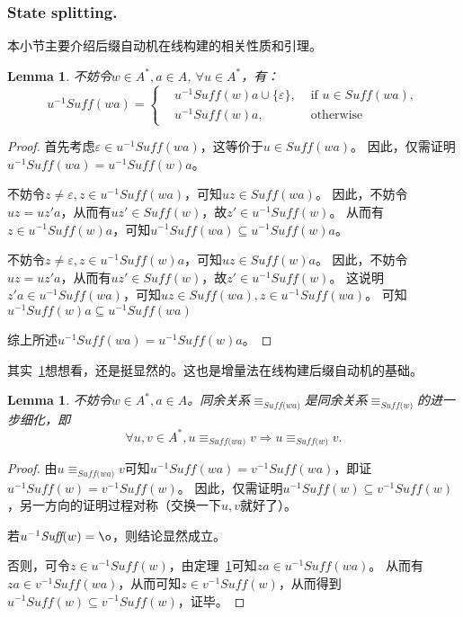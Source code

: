 \documentclass[UTF8]{ctexart}
\newtheorem{lem}[thm]{Lemma}
\theoremstyle{definition}
\theoremstyle{remark}
\numberwithin{equation}{subsection}
\newcommand{\equsuf}[1][x]{\equiv_{\textit{Suff(#1)}}}
\newcommand{\Suff}{\textit{Suff}}
\begin{document}
\subsubsection{State splitting.}
	本小节主要介绍后缀自动机在线构建的相关性质和引理。
	
	\begin{lem}
	\label{lem:sam_build_suff}
		不妨令$w \in A^*, a \in A$, $\forall u \in A^*$，有：
		\[
			u^{-1} \Suff(wa) =
			\left\{
				\begin{aligned}
					&u^{-1} \Suff(w)a \cup \{ \varepsilon \},	&\text{ if } u \in \Suff(wa),	\\
					&u^{-1} \Suff(w)a,							&\text{ otherwise }
				\end{aligned}
			\right .
		\]
	\end{lem}
	\begin{proof}
		首先考虑$\varepsilon \in u^{-1} \Suff(wa)$，这等价于$u \in \Suff(wa)$。
		因此，仅需证明$u^{-1} \Suff(wa) = u^{-1} \Suff(w)a$。
		
		不妨令$z \neq \varepsilon, z \in u^{-1} \Suff(wa)$，可知$uz \in \Suff(wa)$。
		因此，不妨令$uz = uz'a$，从而有$uz' \in \Suff(w)$，故$z' \in u^{-1} \Suff(w)$。
		从而有$z \in u^{-1} \Suff(w)a$，可知$u^{-1} \Suff(wa) \subseteq u^{-1} \Suff(w)a$。
		
		不妨令$z \neq \varepsilon, z \in u^{-1} \Suff(w)a$，可知$uz \in \Suff(w)a$。
		因此，不妨令$uz = uz'a$，从而有$uz' \in \Suff(w)$，故$z' \in u^{-1} \Suff(w)$。
		这说明$z'a \in u^{-1} \Suff(wa)$，可知$uz \in \Suff(wa), z \in u^{-1} \Suff(wa)$。
		可知$u^{-1} \Suff(w)a \subseteq u^{-1} \Suff(wa)$
		
		综上所述$u^{-1} \Suff(wa) = u^{-1} \Suff(w)a$。
	\end{proof}
	其实~\ref{lem:sam_build_suff}想想看，还是挺显然的。这也是增量法在线构建后缀自动机的基础。
	
	\begin{lem}
	\label{lem:sam_build_cong}
		不妨令$w \in A^*, a \in A$。同余关系$\equsuf[wa]$是同余关系$\equsuf[w]$的进一步细化，即
		\[
			\forall u,v \in A^*, u \equsuf[wa] v \Longrightarrow u \equsuf[w] v.
		\]
	\end{lem}
	\begin{proof}
		由$u \equsuf[wa] v$可知$u^{-1} \Suff(wa) = v^{-1} \Suff(wa)$，即证$u^{-1} \Suff(w) = v^{-1} \Suff(w)$。
		因此，仅需证明$u^{-1} \Suff(w) \subseteq v^{-1} \Suff(w)$，另一方向的证明过程对称（交换一下$u,v$就好了）。
		
		若$u^{-1} \Suff(w) = {\o}$，则结论显然成立。
		
		否则，可令$z \in u^{-1} \Suff(w)$，由定理~\ref{lem:sam_build_suff}可知$za \in u^{-1} \Suff(wa)$。
		从而有$za \in v^{-1} \Suff(wa)$，从而可知$z \in v^{-1} \Suff(w)$，从而得到
		$u^{-1} \Suff(w) \subseteq v^{-1} \Suff(w)$，证毕。
	\end{proof}
	
\end{document}
